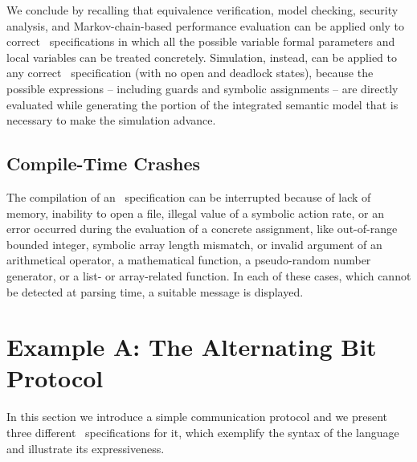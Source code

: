 We conclude by recalling that equivalence verification, model checking, security analysis, and
Markov-chain-based performance evaluation can be applied only to correct \aemilia\ specifications in which
all the possible variable formal parameters and local variables can be treated concretely. Simulation,
instead, can be applied to any correct \aemilia\ specification (with no open and deadlock states), because
the possible expressions -- including guards and symbolic assignments -- are directly evaluated while
generating the portion of the integrated semantic model that is necessary to make the simulation advance.


\subsection{Compile-Time Crashes}\label{ct_crashes}

The compilation of an \aemilia\ specification can be interrupted because of lack of memory, inability to
open a file, illegal value of a symbolic action rate, or an error occurred during the evaluation of a
concrete assignment, like out-of-range bounded integer, symbolic array length mismatch, or invalid argument
of an arithmetical operator, a mathematical function, a pseudo-random number generator, or a list- or
array-related function. In each of these cases, which cannot be detected at parsing time, a suitable message
is displayed.



\section{Example A: The Alternating Bit Protocol}

In this section we introduce a simple communication protocol and we present three different \aemilia\
specifications for it, which exemplify the syntax of the language and illustrate its expressiveness.


